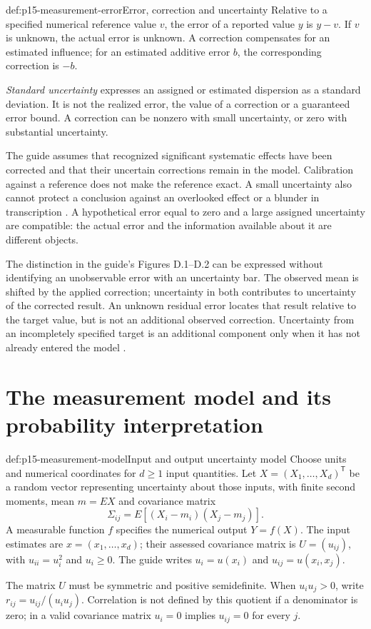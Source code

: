 \begin{hbdefinition}{def:p15-measurement-error}{Error, correction and uncertainty}
Relative to a specified numerical reference value \(v\), the error of a
reported value \(y\) is \(y-v\). If \(v\) is unknown, the actual error is
unknown. A correction compensates for an estimated influence; for an
estimated additive error \(b\), the corresponding correction is \(-b\).

\emph{Standard uncertainty} expresses an assigned or estimated dispersion as
a standard deviation. It is not the realized error, the value of a correction
or a guaranteed error bound. A correction can be nonzero with small
uncertainty, or zero with substantial uncertainty.
\end{hbdefinition}

The guide assumes that recognized significant systematic effects have been
corrected and that their uncertain corrections remain in the model.
Calibration against a reference does not make the reference exact.
A small uncertainty also cannot protect a conclusion against an overlooked
effect or a blunder in transcription \cite[3.2--3.4]{JCGM1002008EMeasurement}.
A hypothetical error equal to zero and a large assigned uncertainty are
compatible: the actual error and the information available about it are
different objects.

The distinction in the guide's Figures D.1--D.2 can be expressed without
identifying an unobservable error with an uncertainty bar. The observed mean
is shifted by the applied correction; uncertainty in both contributes to
uncertainty of the corrected result. An unknown residual error locates that
result relative to the target value, but is not an additional observed
correction. Uncertainty from an incompletely specified target is an additional
component only when it has not already entered the model
\cite[D.6, Figs.~D.1--D.2]{JCGM1002008EMeasurement}.

\section{The measurement model and its probability interpretation}
\label{sec:p15-measurement-model}

\begin{hbdefinition}{def:p15-measurement-model}{Input and output uncertainty model}
Choose units and numerical coordinates for \(d\geq1\) input quantities.
Let \(X=(X_1,\ldots,X_d)^{\mathsf T}\) be a random vector representing
uncertainty about those inputs, with finite second moments, mean
\(m=EX\) and covariance matrix
\[
 \Sigma_{ij}=E[(X_i-m_i)(X_j-m_j)].
\]
A measurable function \(f\) specifies the numerical output \(Y=f(X)\).
The input estimates are \(x=(x_1,\ldots,x_d)\); their assessed covariance
matrix is \(U=(u_{ij})\), with \(u_{ii}=u_i^2\) and \(u_i\geq0\).
The guide writes \(u_i=u(x_i)\) and \(u_{ij}=u(x_i,x_j)\).

The matrix \(U\) must be symmetric and positive semidefinite. When
\(u_i u_j>0\), write \(r_{ij}=u_{ij}/(u_i u_j)\). Correlation is not defined
by this quotient if a denominator is zero; in a valid covariance matrix
\(u_i=0\) implies \(u_{ij}=0\) for every \(j\).
\end{hbdefinition}

